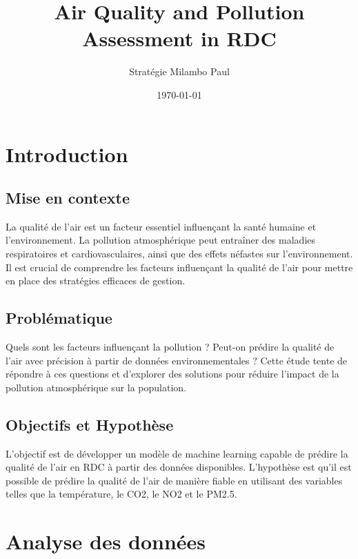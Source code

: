 \documentclass[12pt]{article}
\title{Air Quality and Pollution Assessment in RDC}
\author{Stratégie Milambo Paul}
\date{\today}
\begin{document}
\maketitle

\section{Introduction}
\subsection{Mise en contexte}
La qualité de l'air est un facteur essentiel influençant la santé humaine et l'environnement. La pollution atmosphérique peut entraîner des maladies respiratoires et cardiovasculaires, ainsi que des effets néfastes sur l'environnement. Il est crucial de comprendre les facteurs influençant la qualité de l'air pour mettre en place des stratégies efficaces de gestion.

\subsection{Problématique}
Quels sont les facteurs influençant la pollution ? Peut-on prédire la qualité de l'air avec précision à partir de données environnementales ? Cette étude tente de répondre à ces questions et d'explorer des solutions pour réduire l'impact de la pollution atmosphérique sur la population.

\subsection{Objectifs et Hypothèse}
L'objectif est de développer un modèle de machine learning capable de prédire la qualité de l'air en RDC à partir des données disponibles. L'hypothèse est qu'il est possible de prédire la qualité de l'air de manière fiable en utilisant des variables telles que la température, le CO2, le NO2 et le PM2.5.

\section{Analyse des données}
\end{document}
